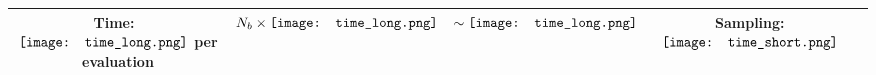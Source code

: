 \documentclass[10pt, margin=1mm,convert={density=500,outext=.png}]{standalone}
\begin{document}
\begin{tabular}{ccccc}
Time:~
$\vcenter{\hbox{\texttt{[image: time\_long.png]}}}$ per evaluation &

$N_b \times \vcenter{\hbox{\texttt{[image: time\_long.png]}}}$

&

$\sim \vcenter{\hbox{\texttt{[image: time\_long.png]}}}$

&

Sampling: $\vcenter{\hbox{\texttt{[image: time\_short.png]}}}$

\\

\bottomrule
\end{tabular}
\end{document}
